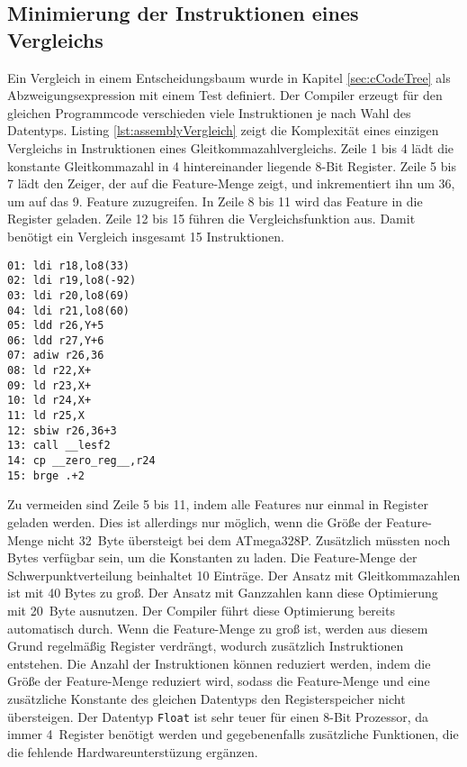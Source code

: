 \subsection{Minimierung der Instruktionen eines Vergleichs}
Ein Vergleich in einem Entscheidungsbaum wurde in Kapitel \ref{sec:cCodeTree} als Abzweigungsexpression mit einem Test definiert. Der Compiler erzeugt für den gleichen Programmcode verschieden viele Instruktionen
je nach Wahl des Datentyps.
\newpage
Listing \ref{lst:assemblyVergleich} zeigt die Komplexität eines einzigen Vergleichs in Instruktionen eines Gleitkommazahlvergleichs. Zeile 1 bis 4 lädt die konstante Gleitkommazahl in 4 hintereinander liegende
8-Bit Register. Zeile 5 bis 7 lädt den Zeiger, der auf die Feature-Menge zeigt, und inkrementiert ihn um 36, um auf das 9. Feature zuzugreifen. In Zeile 8 bis 11 wird das Feature in die Register geladen. Zeile 12 bis 15 führen die
Vergleichsfunktion aus. Damit benötigt ein Vergleich insgesamt 15 Instruktionen.
\begin{lstlisting}[label=lst:assemblyVergleich,caption={Vergleich von Feature als Gleitkommazahl mit konstanter Gleitkommazahl.}]
01: ldi r18,lo8(33)
02: ldi r19,lo8(-92)
03: ldi r20,lo8(69)
04: ldi r21,lo8(60)
05: ldd r26,Y+5
06: ldd r27,Y+6
07: adiw r26,36
08: ld r22,X+
09: ld r23,X+
10: ld r24,X+
11: ld r25,X
12: sbiw r26,36+3
13: call __lesf2
14: cp __zero_reg__,r24
15: brge .+2
\end{lstlisting}
Zu vermeiden sind Zeile 5 bis 11, indem alle Features nur einmal in Register geladen werden. Dies ist allerdings nur möglich, wenn die Größe der Feature-Menge nicht 32~Byte übersteigt bei dem
ATmega328P. Zusätzlich müssten noch Bytes verfügbar sein, um die Konstanten zu laden. Die Feature-Menge der Schwerpunktverteilung beinhaltet 10 Einträge. Der Ansatz mit Gleitkommazahlen ist mit 40 Bytes zu groß.
Der Ansatz mit Ganzzahlen kann diese Optimierung mit 20~Byte ausnutzen. Der Compiler führt diese Optimierung bereits automatisch durch. Wenn die Feature-Menge zu groß ist, werden aus diesem Grund regelmäßig
Register verdrängt, wodurch zusätzlich Instruktionen entstehen. Die Anzahl der Instruktionen können reduziert werden, indem die Größe der Feature-Menge reduziert wird, sodass die Feature-Menge und eine
zusätzliche Konstante des gleichen Datentyps den Registerspeicher nicht übersteigen.
\newline
\newline
Der Datentyp \texttt{Float} ist sehr teuer für einen 8-Bit Prozessor, da immer 4~Register benötigt werden und gegebenenfalls zusätzliche Funktionen, die die fehlende Hardwareunterstüzung ergänzen.
